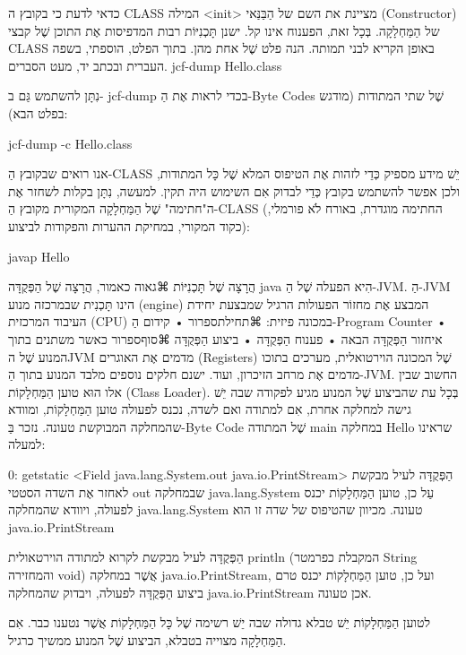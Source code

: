 כדאי לדעת כי בקובץ ה CLASS המילה <init> מציינת את השם של הַבַּנַּאי
(Constructor) של הַמַּחְלָקָה.
בְּכָל זאת, הפענוח אינו קל. ישנן תָּכְנִיּוֹת רבות המדפיסות אֶת התוכן שֶׁל קבצי
CLASS באופן הקריא לבני תמותה. הנה פלט שֶׁל אחת מהן. בתוך הפלט, הוספתי, בשפה
העברית ובכתב יד, מעט הסברים.
jcf-dump Hello.class
\END


נִתָּן להשתמש גַּם ב- jcf-dump  בכדי לראות אֶת הַ-Byte Codes שֶׁל שתי המתודות
(מודגש  בפלט הבא):

jcf-dump -c Hello.class
\END


אנו רואים שבקובץ הַ-CLASS יֵשׁ מידע מספיק כְּדֵי לזהות אֶת הטיפוס המלא שֶׁל כָּל
המתודות, ולכן אפשר להשתמש בקובץ כְּדֵי לבדוק אִם השימוש היה תקין. למעשה, נִתָּן
בקלות לשחזר אֶת ה"חתימה" שֶׁל הַמַּחְלָקָה המקורית מקובץ הַ-CLASS (החתימה
מוגדרת, באורח לֹא פורמלי, כקוד המקורי, במחיקת ההערות והפקודות לביצוע):

javap Hello
\END

הֲרָצָה שֶׁל תָּכְנִיּוֹת ⌘גאוה
כאמור, הֲרָצָה שֶׁל הַפְּקֻדָּה java הִיא הפעלה שֶׁל הַ-JVM. הַ-JVM הינו
תָּכְנִית שבמרכזה מנוע  (engine) המבצע אֶת מחזוֹר הפעולות הרגיל שמבצעת יחידת
העיבוד המרכזית (CPU) במכונה פיזית:
⌘תחילת{ספרור}
•  קידום הַ-Program Counter
•  איחזור הַפְּקֻדָּה הבאה
•  פענוח הַפְּקֻדָּה
•  ביצוע הַפְּקֻדָּה
⌘סוף{ספרור}
כאשר משתנים בתוך המנוע שֶׁל הJVM מדמים אֶת האוגרים (Registers) שֶׁל המכונה
הוירטואלית, מערכים בתוכו מדמים אֶת מרחב הזיכרון, ועוד.
ישנם חלקים נוספים מלבד המנוע בתוך הַ-JVM. החשוב שבין אלו הוּא טוען הַמַּחְלָקוֹת
(Class Loader). בְּכָל עת שהביצוע שֶׁל המנוע מגיע לפקודה שבה יֵשׁ גישה למחלקה
אחרת, אִם למתודה ואם לשדה, נכנס לפעולה טוען הַמַּחְלָקוֹת, ומוודא שהמחלקה
המבוקשת טעונה.
נזכר בַּ-Byte Code שֶׁל המתודה main במחלקה Hello שראינו למעלה:

  0: getstatic <Field java.lang.System.out java.io.PrintStream>
הַפְּקֻדָּה לעיל מבקשת לאחזר אֶת השדה הסטטי out שבמחלקה java.lang.System עַל כן,
טוען הַמַּחְלָקוֹת יכנס לפעולה, ויוודא שהמחלקה java.lang.System טעונה. מכיוון
שהטיפוס של שדה זו הוא  java.io.PrintStream

הַפְּקֻדָּה לעיל מבקשת לקרוא למתודה הוירטאולית println  (המקבלת כפרמטר String
והמחזירה void) אֲשֶׁר במחלקה java.io.PrintStream, ועל כן, טוען הַמַּחְלָקוֹת
יכנס טרם ביצוע הַפְּקֻדָּה לפעולה, ויבדוק שהמחלקה java.io.PrintStream אכן טעונה.


לטוען הַמַּחְלָקוֹת יֵשׁ טבלא גדולה שבה יֵשׁ רשימה שֶׁל כָּל הַמַּחְלָקוֹת
אֲשֶׁר נטענו כבר. אִם הַמַּחְלָקָה מצוייה בטבלא, הביצוע שֶׁל המנוע ממשיך כרגיל.

